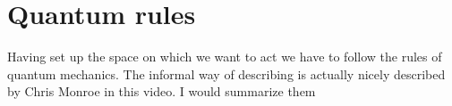 \section{Quantum rules}
Having set up the space on which we want to act we have to follow the rules of quantum mechanics. The informal way of describing is actually nicely described by Chris Monroe in this video. I would summarize them 